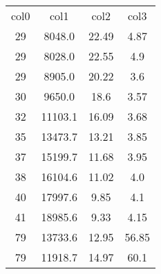 \begin{table}
\begin{tabular}{cccc}
col0 & col1 & col2 & col3 \\
29 & 8048.0 & 22.49 & 4.87 \\
29 & 8028.0 & 22.55 & 4.9 \\
29 & 8905.0 & 20.22 & 3.6 \\
30 & 9650.0 & 18.6 & 3.57 \\
32 & 11103.1 & 16.09 & 3.68 \\
35 & 13473.7 & 13.21 & 3.85 \\
37 & 15199.7 & 11.68 & 3.95 \\
38 & 16104.6 & 11.02 & 4.0 \\
40 & 17997.6 & 9.85 & 4.1 \\
41 & 18985.6 & 9.33 & 4.15 \\
79 & 13733.6 & 12.95 & 56.85 \\
79 & 11918.7 & 14.97 & 60.1 \\
\end{tabular}
\end{table}
